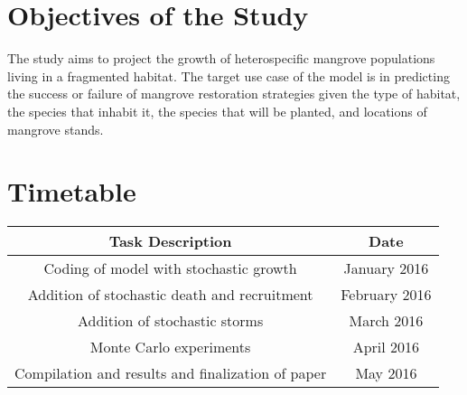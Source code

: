 \documentclass[12pt,letterpaper]{article}
\begin{document}
\section{Objectives of the Study}
The study aims to project the growth of heterospecific mangrove populations	living in a fragmented habitat. The target use case of the model is in predicting the success or failure of mangrove restoration strategies given the type of habitat, the species that inhabit it, the species that will be planted, and locations of mangrove stands.



\section{Timetable}

\begin{tabular}{|c|c|}
\hline
Task Description & Date \\
\hline
Coding of model with stochastic growth & January 2016\\
\hline
Addition of stochastic death and recruitment & February 2016\\
\hline
Addition of stochastic storms & March 2016\\
\hline
Monte Carlo experiments & April 2016\\
\hline
Compilation and results and finalization of paper & May 2016\\
\hline
\end{tabular}



\label{sect:bib}

\end{document}
